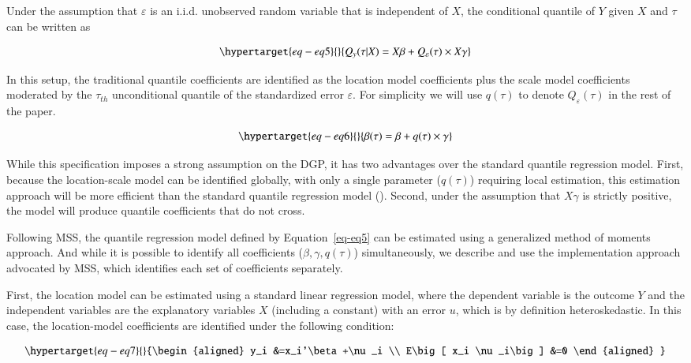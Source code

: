 \documentclass[
  authoryear,
  review,
  1p]{elsarticle}
\begin{document}
Under the assumption that \(\varepsilon\) is an i.i.d. unobserved random
variable that is independent of \(X\), the conditional quantile of \(Y\)
given \(X\) and \(\tau\) can be written as

\begin{equation}\protect\hypertarget{eq-eq5}{}{Q_y(\tau|X) =X\beta+Q_\varepsilon(\tau) \times X\gamma 
}\label{eq-eq5}\end{equation}

In this setup, the traditional quantile coefficients are identified as
the location model coefficients plus the scale model coefficients
moderated by the \(\tau_{th}\) unconditional quantile of the
standardized error \(\varepsilon\). For simplicity we will use
\(q(\tau)\) to denote \(Q_\varepsilon(\tau)\) in the rest of the paper.

\begin{equation}\protect\hypertarget{eq-eq6}{}{\beta(\tau) = \beta + q(\tau) \times \gamma 
}\label{eq-eq6}\end{equation}

While this specification imposes a strong assumption on the DGP, it has
two advantages over the standard quantile regression model. First,
because the location-scale model can be identified globally, with only a
single parameter (\(q(\tau)\)) requiring local estimation, this
estimation approach will be more efficient than the standard quantile
regression model (\citet{zhao2000}). Second, under the assumption that
\(X\gamma\) is strictly positive, the model will produce quantile
coefficients that do not cross.

Following MSS, the quantile regression model defined by
Equation~\ref{eq-eq5} can be estimated using a generalized method of
moments approach. And while it is possible to identify all coefficients
(\(\beta,\gamma, q(\tau)\)) simultaneously, we describe and use the
implementation approach advocated by MSS, which identifies each set of
coefficients separately.

First, the location model can be estimated using a standard linear
regression model, where the dependent variable is the outcome \(Y\) and
the independent variables are the explanatory variables \(X\) (including
a constant) with an error \(u\), which is by definition heteroskedastic.
In this case, the location-model coefficients are identified under the
following condition:

\begin{equation}\protect\hypertarget{eq-eq7}{}{\begin{aligned}
      y_i &=x_i'\beta+\nu_i \\
      E\big[ x_i \nu_i\big] &=0
      \end{aligned}
}\label{eq-eq7}\end{equation}
\end{document}
